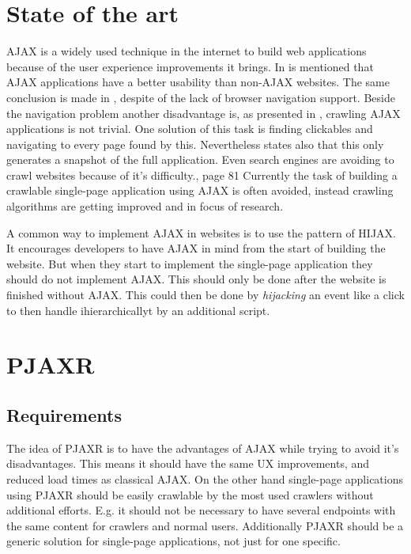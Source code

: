 \documentclass[f,bachelor,binding,twoside,palatino]{WeSTthesis}
\def \ajax {AJAX}
\def \pjaxr {PJAXR}
\def \singlePageApplication {single-page application}
\begin{document}
\section{State of the art}
  \ajax{} is a widely used technique in the internet to build web applications because of the user experience improvements it brings.
  In \cite{roodt06} is mentioned that \ajax{} applications have a better usability than non-\ajax{} websites.
  The same conclusion is made in \cite{klugeKarglWeber07}, despite of the lack of browser navigation support.
  Beside the navigation problem another disadvantage is, as presented in \cite{mesbah09}, crawling \ajax{} applications is not trivial.
  One solution of this task is finding clickables and navigating to every page found by this.
  Nevertheless \cite{mesbah09} states also that this only generates a snapshot of the full application.
  Even search engines are avoiding to crawl websites because of it's difficulty.\cite{matter08}, page 81
  Currently the task of building a crawlable \singlePageApplication{} using \ajax{} is often avoided, instead crawling algorithms are getting improved and in focus of research.

  A common way to implement \ajax{} in websites is to use the pattern of HIJAX.
  It encourages developers to have \ajax{} in mind from the start of building the website. 
  But when they start to implement the \singlePageApplication{} they should do not implement \ajax{}.
  This should only be done after the website is finished without \ajax{}.
  This could then be done by \emph{hijacking} an event like a click to then handle ihierarchicallyt by an additional script.

  
\section{\pjaxr{}}
  \subsection{Requirements}
  The idea of \pjaxr{} is to have the advantages of \ajax{} while trying to avoid it's disadvantages.
  This means it should have the same UX improvements, and reduced load times as classical \ajax{}.
  On the other hand \singlePageApplication{}s using \pjaxr{} should be easily crawlable by the most used crawlers without additional efforts.
  E.g. it should not be necessary to have several endpoints with the same content for crawlers and normal users.
  Additionally \pjaxr{} should be a generic solution for \singlePageApplication{}s, not just for one specific.
\end{document}
